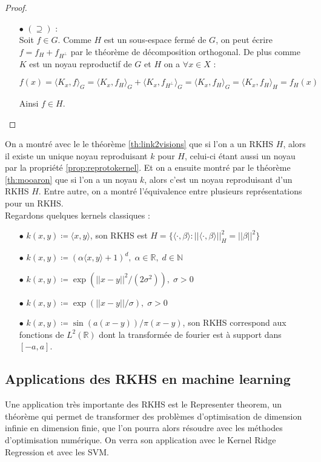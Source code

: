 \documentclass[a4paper, 11pt, french]{article}
\theoremstyle{definition}
\begin{document}
\begin{proof}
\begin{itemize}
			\item[$\bullet$]
			$(\supseteq)$ : \\
			Soit $f \in G$. Comme $H$ est un sous-espace fermé de $G$, on peut écrire $f = f_{H} + f_{H^\perp}$ par le théorème de décomposition orthogonal. De plus comme $K$ est un noyau reproductif de $G$ et $H$ on a $\forall x \in X$ :
			
			\[f(x) = \langle K_x, f \rangle_G = \langle K_x, f_{H} \rangle_G + \langle K_x, f_{H^\perp} \rangle_G = \langle K_x, f_{H} \rangle_G = \langle K_x, f_{H} \rangle_H = f_H (x) \]
			
			Ainsi $f \in H$.
		\end{itemize}	
	\end{proof}

	On a montré avec le le théorème \ref{th:link2visions} que si l'on a un RKHS $H$, alors il existe un unique noyau reproduisant $k$ pour $H$, celui-ci étant aussi un noyau par la propriété  \ref{prop:reprotokernel}. Et on a ensuite montré par le théorème \ref{th:mooaron} que si l'on a un noyau $k$, alors c'est un noyau reproduisant d'un RKHS $H$. Entre autre, on a montré l'équivalence entre plusieurs représentations pour un RKHS. \\
	
	Regardons quelques kernels classiques :
	\begin{itemize}
		\item[$\bullet$] $k(x, y) \coloneqq \langle x, y \rangle$, son RKHS est $H = \{\langle \cdot, \beta \rangle : ||\langle \cdot, \beta \rangle||_H^2 = ||\beta||^2\}$
		\item[$\bullet$] $k(x, y) \coloneqq (\alpha \langle x, y \rangle + 1)^d, \; \alpha \in \mathbb{R}, \; d \in \mathbb{N}$
		\item[$\bullet$] $k(x, y) \coloneqq \exp(||x-y||^2 / (2\sigma^2)), \; \sigma > 0$
		\item[$\bullet$] $k(x, y) \coloneqq \exp(||x-y|| / \sigma), \; \sigma > 0$
		\item[$\bullet$] $k(x, y) \coloneqq \sin (a(x-y)) / \pi (x-y)$, son RKHS correspond aux fonctions de $L^2(\mathbb{R})$ dont la transformée de fourier est à support dans $[-a, a]$.
	\end{itemize}
	
	\subsection{Applications des RKHS en machine learning}
	
	Une application très importante des RKHS est le Representer theorem, un théorème qui permet de transformer des problèmes d'optimisation de dimension infinie en dimension finie, que l'on pourra alors résoudre avec les méthodes d'optimisation numérique. On verra son application avec le Kernel Ridge Regression et avec les SVM.
	
\end{document}
